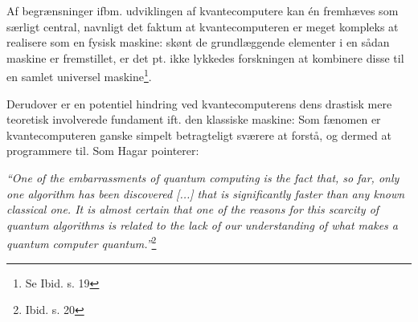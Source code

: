 \documentclass[10pt,a4paper]{article}
\newcommand{\citat}[2]{\begin{justify}\textit{``#1''}\hspace{0.1cm}\footnote{#2}\end{justify}}
\begin{document}
Af begrænsninger ifbm. udviklingen af kvantecomputere kan én fremhæves som særligt
central, navnligt det faktum at kvantecomputeren er meget kompleks at realisere 
som en fysisk maskine: skønt de grundlæggende elementer i en sådan maskine er 
fremstillet, er det pt. ikke lykkedes forskningen at kombinere disse til en samlet
universel maskine\footnote{Se Ibid. s. 19}.

Derudover er en potentiel hindring ved kvantecomputerens dens drastisk mere 
teoretisk involverede fundament ift. den klassiske maskine:  
Som fænomen er kvantecomputeren ganske simpelt betragteligt sværere at forstå, 
og dermed at programmere til.
Som Hagar pointerer: 
\citat{One of the embarrassments of quantum computing is the fact that, so far, 
only one algorithm has been discovered [...] that is significantly faster than 
any \textit{known} classical one. It is almost certain that one of the reasons for
this scarcity of quantum algorithms is related to the lack of our understanding
of what makes a quantum computer quantum.}{Ibid. s. 20}
\end{document}
